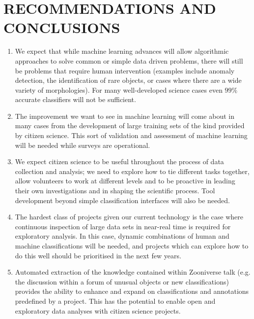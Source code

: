 \documentclass{pasa}
\begin{document}
\section{RECOMMENDATIONS AND CONCLUSIONS}
\label{sec:conclusions}

\begin{enumerate} 

\item We expect that while machine learning advances will allow algorithmic approaches to solve common or simple data driven problems, there will still be problems that require human intervention (examples include anomaly detection, the identification of rare objects, or cases where there are a wide variety of morphologies). For many well-developed science cases even $99\%$ accurate classifiers will not be sufficient. 

\item The improvement we want to see in machine learning will come about in many cases from the development of large training sets of the kind provided by citizen science.  This sort of validation and assessment of machine learning will be needed while surveys are operational. 

\item We expect citizen science to be useful throughout the process of data collection and analysis; we need to explore how to tie different tasks together, allow volunteers to work at different levels and to be proactive in leading their own investigations and in shaping the scientific process. Tool development beyond simple classification interfaces will also be needed. 

\item The hardest class of projects given our current technology is the case where continuous inspection of large data sets in near-real time is required for exploratory analysis. In this case, dynamic combinations of human and machine classifications will be needed, and projects which can explore how to do this well should be prioritised in the next few years. 

\item Automated extraction of the knowledge contained within Zooniverse talk (e.g. the discussion within a forum of unusual objects or new classifications) provides the ability to enhance and expand on classifications and annotations predefined by a project. This has the potential to enable open and exploratory data analyses with citizen science projects.


\end{enumerate}
\end{document}
